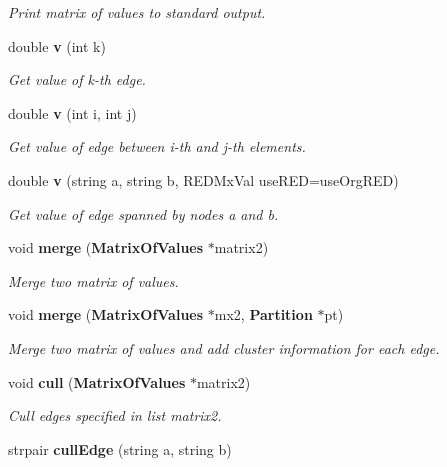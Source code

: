 \begin{CompactItemize}
\begin{CompactList}\small\item\em Print matrix of values to standard output. \item\end{CompactList}\item 
double {\bf v} (int k)\label{classMatrixOfValues_a15}

\begin{CompactList}\small\item\em Get value of k-th edge. \item\end{CompactList}\item 
double {\bf v} (int i, int j)\label{classMatrixOfValues_a16}

\begin{CompactList}\small\item\em Get value of edge between i-th and j-th elements. \item\end{CompactList}\item 
double {\bf v} (string a, string b, REDMx\-Val use\-RED=use\-Org\-RED)
\begin{CompactList}\small\item\em Get value of edge spanned by nodes a and b. \item\end{CompactList}\item 
void {\bf merge} ({\bf Matrix\-Of\-Values} $\ast$matrix2)\label{classMatrixOfValues_a18}

\begin{CompactList}\small\item\em Merge two matrix of values. \item\end{CompactList}\item 
void {\bf merge} ({\bf Matrix\-Of\-Values} $\ast$mx2, {\bf Partition} $\ast$pt)
\begin{CompactList}\small\item\em Merge two matrix of values and add cluster information for each edge. \item\end{CompactList}\item 
void {\bf cull} ({\bf Matrix\-Of\-Values} $\ast$matrix2)\label{classMatrixOfValues_a20}

\begin{CompactList}\small\item\em Cull edges specified in list matrix2. \item\end{CompactList}\item 
strpair {\bf cull\-Edge} (string a, string b)\label{classMatrixOfValues_a21}


\end{CompactItemize}
